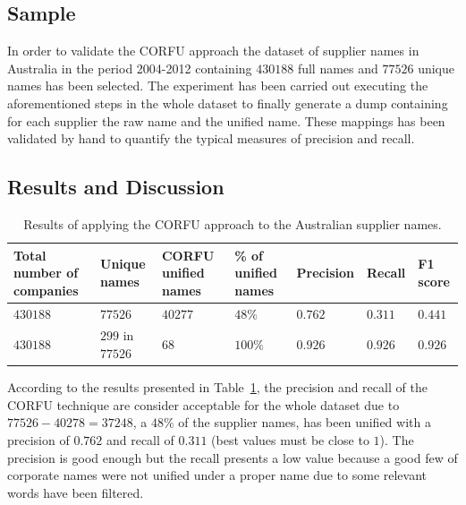 \documentclass{llncs}
\begin{document}
\subsection{Sample}
In order to validate the CORFU approach the dataset of supplier names in Australia 
in the period 2004-2012 containing $430188$ full names 
and $77526$ unique names has been selected. The experiment has been 
carried out executing the aforementioned steps in the whole dataset 
to finally generate a dump containing for each supplier the 
raw name and the unified name. These mappings has been validated 
by hand to quantify the typical measures of precision and recall. 


\subsection{Results and Discussion}

\begin{table}[!h]
\renewcommand{\arraystretch}{1.3}
\begin{center}
\begin{tabular}{|p{2.5cm}|p{2cm}|p{1.5cm}|p{1.8cm}|l|l|l|}
\hline
  \textbf{Total number of companies} & \textbf{Unique names}& \textbf{CORFU unified names}& \textbf{\% of unified names} & \textbf{Precision} & \textbf{Recall} & \textbf{F1 score} \\  \hline
   $430188$ & $77526$ & $40277$  &$48\%$ & $0.762$ & $0.311$&$0.441$ \\ \hline   
   $430188$ & $299$ in $77526$ & $68$ & $100\%$&  $0.926$ & $0.926$ &$0.926$\\ \hline
  \hline
  \end{tabular}
  \caption{Results of applying the CORFU approach to the Australian supplier names.}
  \label{tabla:aus-results}
  \end{center}
\end{table} 


According to the results presented in Table~\ref{tabla:aus-results}, the precision 
and recall of the CORFU technique are consider acceptable for the whole dataset 
due to $77526-40278=37248$, a $48\%$ of the supplier names, has been unified with 
a precision of $0.762$ and recall of $0.311$ (best values must be close to $1$). 
The precision is good enough but the recall presents a low value because a good few of 
corporate names were not unified under a proper name due to some relevant 
words have been filtered.
\end{document}
